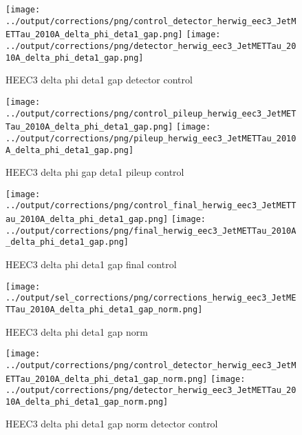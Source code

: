 \documentclass[11pt]{book}
\begin{document}
\begin{figure}[ht]
\centering
\texttt{[image: ../output/corrections/png/control\_detector\_herwig\_eec3\_JetMETTau\_2010A\_delta\_phi\_deta1\_gap.png]}
\texttt{[image: ../output/corrections/png/detector\_herwig\_eec3\_JetMETTau\_2010A\_delta\_phi\_deta1\_gap.png]}
\caption{HEEC3 delta phi deta1 gap detector control}
\label{fig:HEEC3_JetMETTau_2010A_delta_phi_deta1_gap_detector_control}
\end{figure}

\begin{figure}[ht]
\centering
\texttt{[image: ../output/corrections/png/control\_pileup\_herwig\_eec3\_JetMETTau\_2010A\_delta\_phi\_deta1\_gap.png]}
\texttt{[image: ../output/corrections/png/pileup\_herwig\_eec3\_JetMETTau\_2010A\_delta\_phi\_deta1\_gap.png]}
\caption{HEEC3 delta phi gap deta1 pileup control}
\label{fig:HEEC3_JetMETTau_2010A_delta_phi_deta1_gap_pileup_control}
\end{figure}


\begin{figure}[ht]
\centering
\texttt{[image: ../output/corrections/png/control\_final\_herwig\_eec3\_JetMETTau\_2010A\_delta\_phi\_deta1\_gap.png]}
\texttt{[image: ../output/corrections/png/final\_herwig\_eec3\_JetMETTau\_2010A\_delta\_phi\_deta1\_gap.png]}
\caption{HEEC3 delta phi deta1 gap final control}
\label{fig:HEEC3_JetMETTau_2010A_delta_phi_deta1_gap_final_control}
\end{figure}

\begin{figure}[ht]
\centering
\texttt{[image: ../output/sel\_corrections/png/corrections\_herwig\_eec3\_JetMETTau\_2010A\_delta\_phi\_deta1\_gap\_norm.png]}
\caption{HEEC3 delta phi deta1 gap norm}
\label{fig:HEEC3_JetMETTau_2010A_delta_phi_deta1_gap_norm}
\end{figure}

\begin{figure}[ht]
\centering
\texttt{[image: ../output/corrections/png/control\_detector\_herwig\_eec3\_JetMETTau\_2010A\_delta\_phi\_deta1\_gap\_norm.png]}
\texttt{[image: ../output/corrections/png/detector\_herwig\_eec3\_JetMETTau\_2010A\_delta\_phi\_deta1\_gap\_norm.png]}
\caption{HEEC3 delta phi deta1 gap norm detector control}
\label{fig:HEEC3_JetMETTau_2010A_delta_phi_deta1_gap_norm_detector_control}
\end{figure}
\end{document}
